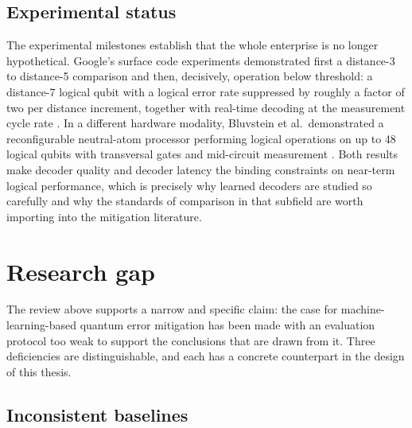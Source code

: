 \documentclass[Thesis.tex]{subfiles}
\begin{document}
\subsection{Experimental status}

The experimental milestones establish that the whole enterprise is no longer
hypothetical. Google's surface code experiments demonstrated first a
distance-3 to distance-5 comparison and then, decisively, operation below
threshold: a distance-7 logical qubit with a logical error rate suppressed by
roughly a factor of two per distance increment, together with real-time
decoding at the measurement cycle rate \cite{google2025below}. In a different
hardware modality, Bluvstein et al.\ demonstrated a reconfigurable
neutral-atom processor performing logical operations on up to 48 logical
qubits with transversal gates and mid-circuit measurement
\cite{bluvstein2024logical}. Both results make decoder quality and decoder
latency the binding constraints on near-term logical performance, which is
precisely why learned decoders are studied so carefully and why the standards
of comparison in that subfield are worth importing into the mitigation
literature.

\section{Research gap}\label{sec2:gap}

The review above supports a narrow and specific claim: the case for
machine-learning-based quantum error mitigation has been made with an
evaluation protocol too weak to support the conclusions that are drawn from it.
Three deficiencies are distinguishable, and each has a concrete counterpart in
the design of this thesis.

\subsection{Inconsistent baselines}
\end{document}
